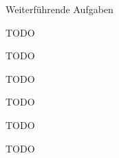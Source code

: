 \documentclass[
    inlineshortcut=java, %
    corporatedesign, %
    boxarc, %
    fop, %
]{algoexercise}
\begin{document}
    \setcounter{task}{3}
    \begin{task}[points=auto]{Weiterführende Aufgaben}\label{ex:H4} %

        \begin{subtask}[title=Weiterentwicklung des GUIs]\label{ex:H4.1}
            TODO
        \end{subtask}

        \begin{subtask}[title=Neuer Rohstoff,points=5]\label{ex:H4.3}
            TODO
        \end{subtask}

        \begin{subtask}[title=Neue Gebäudestruktur,points=5]\label{ex:H4.4}
            TODO
        \end{subtask}

        \begin{subtask}[title={Neue Entwicklungskarte},points=5]\label{ex:H4.2}
            TODO
        \end{subtask}

        \begin{subtask}[title=Neue Spielmechanik,points=5]\label{ex:H4.5}
            TODO
        \end{subtask}

        \begin{subtask}[title=AI als Gegner?,points=5]\label{ex:H4.6}
            TODO
        \end{subtask}
    \end{task}
\end{document}
